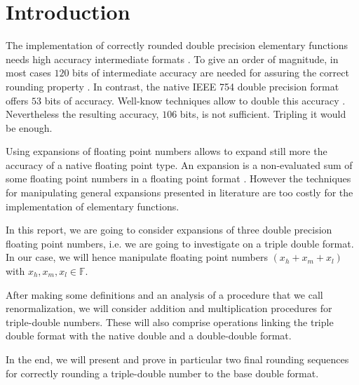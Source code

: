 \documentclass[a4paper,10pt,twoside]{article}
\newcommand{\F}{\ensuremath{\mathbb {F}}}
\newcommand{\hi}{\ensuremath{\mathit{h}}}
\newcommand{\mi}{\ensuremath{\mathit{m}}}
\newcommand{\lo}{\ensuremath{\mathit{l}}}
\begin{document}
\section{Introduction}
The implementation of correctly rounded double precision elementary functions needs high accuracy intermediate 
formats \cite{Muller97,Defour-thesis,crlibmweb,DinDefLau2004LIP}. To give an order of magnitude, in most cases
$120$ bits of intermediate accuracy are needed for assuring the correct rounding property \cite{DinDefLau2004LIP}.
In contrast, the native IEEE 754 double precision format offers $53$ bits of accuracy. Well-know techniques
allow to double this accuracy \cite{Dek71}. Nevertheless the resulting accuracy, $106$ bits, is not sufficient. 
Tripling it would be enough.\par
Using expansions of floating point numbers allows to expand still more the accuracy of a native floating point type.
An expansion is a non-evaluated sum of some floating point numbers in a floating  
point format \cite{Finot-thesis, Pri91, She97}. However the techniques for manipulating general expansions presented
in literature are too costly for the implementation of elementary functions.\par
In this report, we are going to consider expansions of three double
precision floating point numbers, i.e. we are going to investigate on a triple
double format. In our case, we will hence manipulate floating
point numbers $(x_\hi + x_\mi + x_\lo)$ with $x_\hi, x_\mi, x_\lo \in \F$.\par
After making some definitions and an analysis of a procedure that we call
renormalization, we will consider addition and multiplication procedures for
triple-double numbers. These will also comprise operations linking the triple
double format with the native double and a double-double format.\par
In the end,
we will present and prove in particular two final rounding sequences for correctly
rounding a triple-double number to the base double format.
\end{document}
